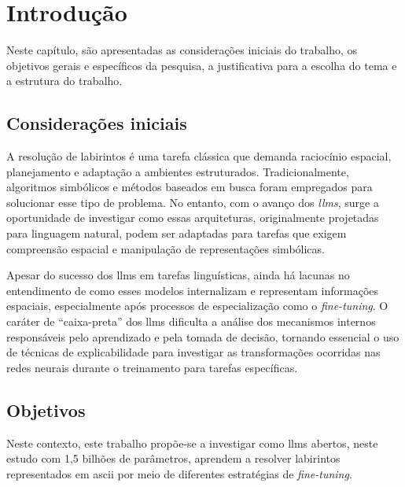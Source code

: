 

\chapter{Introdução}\label{cap:introducao}

Neste capítulo, são apresentadas as considerações iniciais do trabalho, os objetivos gerais e específicos da pesquisa, a justificativa para a escolha do tema e a estrutura do trabalho.

\section{Considerações iniciais}\label{sec:consideracoesIniciais}

A resolução de labirintos é uma tarefa clássica que demanda raciocínio espacial, planejamento e adaptação a ambientes estruturados. Tradicionalmente, algoritmos simbólicos e métodos baseados em busca foram empregados para solucionar esse tipo de problema. No entanto, com o avanço dos \textit{\gls{llms}}, surge a oportunidade de investigar como essas arquiteturas, originalmente projetadas para linguagem natural, podem ser adaptadas para tarefas que exigem compreensão espacial e manipulação de representações simbólicas.

Apesar do sucesso dos \gls{llms} em tarefas linguísticas, ainda há lacunas no entendimento de como esses modelos internalizam e representam informações espaciais, especialmente após processos de especialização como o \textit{fine-tuning}. O caráter de ``caixa-preta'' dos \gls{llms} dificulta a análise dos mecanismos internos responsáveis pelo aprendizado e pela tomada de decisão, tornando essencial o uso de técnicas de explicabilidade para investigar as transformações ocorridas nas redes neurais durante o treinamento para tarefas específicas.

\section{Objetivos}\label{sec:objetivos}

Neste contexto, este trabalho propõe-se a investigar como \gls{llms} abertos, neste estudo com 1,5 bilhões de parâmetros, aprendem a resolver labirintos representados em \gls{ascii} por meio de diferentes estratégias de \textit{fine-tuning}.

